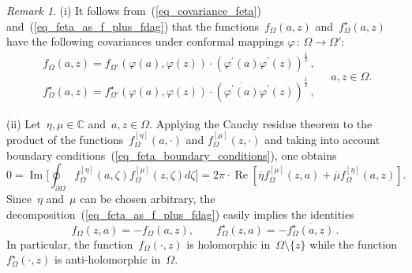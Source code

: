 \documentclass[reqno,11pt,a4paper]{amsart}
\theoremstyle{remark}
\newtheorem{remark}[proposition]{Remark}
\newcommand{\feta}{f_{\Omega}^{[\eta]}}
\newcommand{\f}{f_{\Omega}}
\newcommand{\fstar}{f_{\Omega}^\star}
\newcommand{\fprime}{f_{\Omega'}}
\newcommand{\fstarprime}{f_{\Omega'}^\star}
\newcommand{\fmu}{f_{\Omega}^{[\mu]}}
\renewcommand\Re{\operatorname{Re}}
\renewcommand\Im{\operatorname{Im}}
\begin{document}
\begin{remark}
(i) It follows from~(\ref{eq_covariance_feta}) and~(\ref{eq_feta_as_f_plus_fdag}) that
the functions~$\f(a,z)$ and~$\fstar(a,z)$ have the following covariances under conformal mappings $\varphi \, : \, \Omega \to \Omega'$:
\begin{equation}
\label{eq_covariance_f_fdag}
\begin{array}{l}
\f (a,z) = \fprime (\varphi(a), \varphi(z)) \cdot (\varphi^\prime(a)\varphi^\prime(z))^\frac{1}{2}\,, \\
\fstar (a,z) = \fstarprime (\varphi(a), \varphi(z))  \cdot (\overline{\varphi^\prime(a)}\varphi^\prime(z))^\frac{1}{2}\,,
\end{array}
\quad a,z\in\Omega.
\end{equation}

\noindent (ii) Let~$\eta,\mu \in \mathbb{C}$ and~$a,z\in\Omega$.  Applying the Cauchy residue theorem to the product of the functions~$\feta(a,\cdot)$ and $\fmu(z,\cdot)$ and taking into account boundary conditions~(\ref{eq_feta_boundary_conditions}), one obtains
\[
0 = \Im\biggl[\oint_{\partial \Omega} \feta(a,\zeta)\fmu(z,\zeta)d\zeta\biggr] = 2\pi \cdot \Re\left[\overline{\eta}\fmu(z,a)+\overline{\mu}\feta(a,z)\right].
\]
Since~$\eta$ and~$\mu$ can be chosen arbitrary, the decomposition~(\ref{eq_feta_as_f_plus_fdag}) easily implies the identities
\begin{equation}
\label{eq_symmetries_f}
\f(z,a) = - \f(a,z), \qquad \fstar(z,a) = -\overline{\fstar(a,z)}\,.
\end{equation}
In particular, the function~$\f(\cdot,z)$ is holomorphic in~$\Omega\setminus\{z\}$ while the function~$\fstar(\cdot,z)$ is anti-holomorphic in~$\Omega$.
\end{remark}
\end{document}
